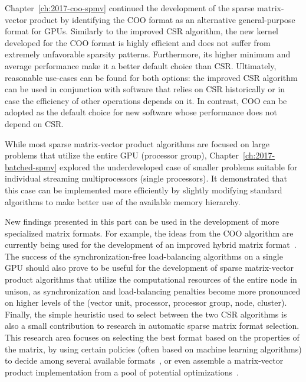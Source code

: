 Chapter~\ref{ch:2017-coo-spmv} continued the development of the sparse
matrix-vector product by identifying the COO format as an alternative
general-purpose format for GPUs. Similarly to the improved CSR algorithm, the
new kernel developed for the COO format is highly efficient and does not suffer
from extremely unfavorable sparsity patterns. Furthermore, its higher minimum
and average performance make it a better default choice than CSR. Ultimately,
reasonable use-cases can be found for both options: the improved CSR algorithm
can be used in conjunction with software that relies on CSR historically or in
case the efficiency of other operations depends on it. In contrast, COO can be
adopted as the default choice for new software whose performance does not depend
on CSR.

While most sparse matrix-vector product algorithms are focused on large
problems that utilize the entire GPU (processor group),
Chapter~\ref{ch:2017-batched-spmv} explored the underdeveloped case of smaller
problems suitable for individual streaming multiprocessors (single processors).
It demonstrated that this case can be implemented more efficiently by slightly
modifying standard algorithms to make better use of the available memory
hierarchy.

New findings presented in this part  can be used in the development of more
specialized matrix formats. For example, the ideas from the COO algorithm are
currently being used for the development of an improved hybrid matrix
format~\cite{hybrid}. The success of the synchronization-free load-balancing
algorithms on a single GPU should also prove to be useful for the development of
sparse matrix-vector product algorithms that utilize the computational resources
of the entire node in unison, as synchronization and load-balancing penalties
become more pronounced on higher levels of the 
(vector unit, processor, processor group, node, cluster). Finally, the
simple heuristic used to select between the two CSR algorithms is also a small
contribution to research in automatic sparse matrix format selection. This
research area focuses on selecting the best format based on the properties of
the matrix, by using certain policies (often based on machine learning
algorithms) to decide among several available
formats~\cite{clspmv,gpu-selection}, or even assemble a matrix-vector product
implementation from a pool of potential optimizations~\cite{elafrou}.

